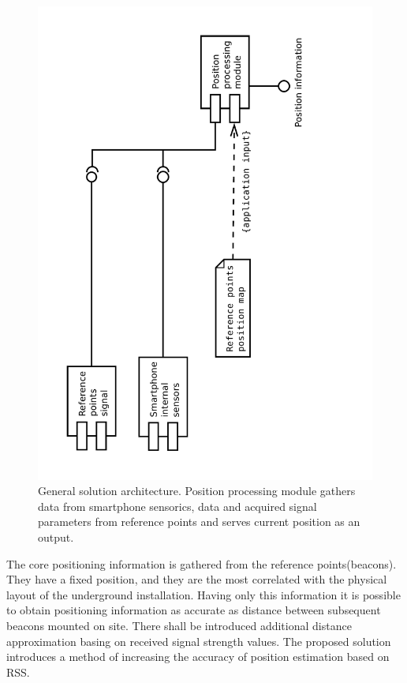\documentclass[../main.tex]{subfiles}
\begin{document}
\begin{figure}[!htbp]
\includegraphics[height=\textwidth, angle=270, trim={0 0 4cm 0},clip]{pictures/architecture_general.pdf}
\centering
\caption{General solution architecture. Position processing module gathers data from smartphone sensorics, data and acquired signal parameters from reference points and serves current position as an output.}
\label{fig:architecture_general}
\end{figure}

The core positioning information is gathered from the reference points(beacons). They have a fixed position, and they are the most correlated with the physical layout of the underground installation. Having only this information it is possible to obtain positioning information as accurate as distance between subsequent beacons mounted on site. There shall be introduced additional distance approximation basing on received signal strength values. The proposed solution introduces a method of increasing the accuracy of position estimation based on RSS.
\end{document}

